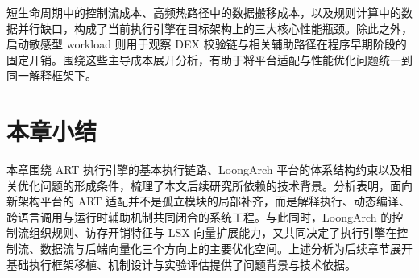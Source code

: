 短生命周期中的控制流成本、高频热路径中的数据搬移成本，以及规则计算中的数据并行缺口，构成了当前执行引擎在目标架构上的三大核心性能瓶颈。除此之外，启动敏感型 workload 则用于观察 DEX 校验链与相关辅助路径在程序早期阶段的固定开销。围绕这些主导成本展开分析，有助于将平台适配与性能优化问题统一到同一解释框架下。

\section{本章小结}

本章围绕 ART 执行引擎的基本执行链路、LoongArch 平台的体系结构约束以及相关优化问题的形成条件，梳理了本文后续研究所依赖的技术背景。分析表明，面向新架构平台的 ART 适配并不是孤立模块的局部补齐，而是解释执行、动态编译、跨语言调用与运行时辅助机制共同闭合的系统工程。与此同时，LoongArch 的控制流组织规则、访存开销特征与 LSX 向量扩展能力，又共同决定了执行引擎在控制流、数据流与后端向量化三个方向上的主要优化空间。上述分析为后续章节展开基础执行框架移植、机制设计与实验评估提供了问题背景与技术依据。
